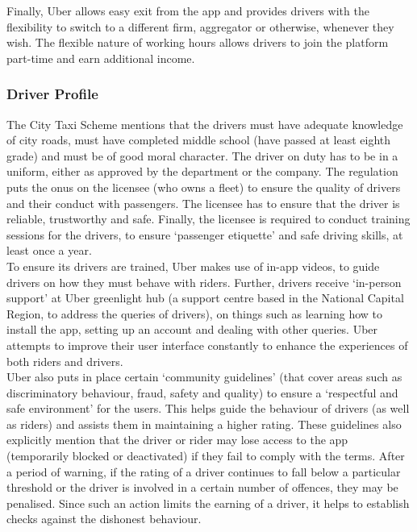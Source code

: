 \documentclass[a4paper, 12pt, twoside]{article}
\begin{document}
Finally, Uber allows easy exit from the app and provides drivers with the flexibility to switch to a different firm, aggregator or otherwise, whenever they wish. The flexible nature of working hours allows drivers to join the platform part-time and earn additional income.

\subsubsection{Driver Profile}
The City Taxi Scheme mentions that the drivers must have adequate knowledge of city roads, must have completed middle school (have passed at least eighth grade) and must be of good moral character. The driver on duty has to be in a uniform, either as approved by the department or the company. The regulation puts the onus on the licensee (who owns a fleet) to ensure the quality of drivers and their conduct with passengers. The licensee has to ensure that the driver is reliable, trustworthy and safe. Finally, the licensee is required to conduct training sessions for the drivers, to ensure ‘passenger etiquette’ and safe driving skills, at least once a year. \\

To ensure its drivers are trained, Uber makes use of in-app videos, to guide drivers on how they must behave with riders. Further, drivers receive ‘in-person support’ at Uber greenlight hub (a support centre based in the National Capital Region, to address the queries of drivers), on things such as learning how to install the app, setting up an account and dealing with other queries. Uber attempts to improve their user interface constantly to enhance the experiences of both riders and drivers. \\

Uber also puts in place certain ‘community guidelines’ (that cover areas such as discriminatory behaviour, fraud, safety and quality) to ensure a ‘respectful and safe environment’ for the users. This helps guide the behaviour of drivers (as well as riders) and assists them in maintaining a higher rating. These guidelines also explicitly mention that the driver or rider may lose access to the app (temporarily blocked or deactivated) if they fail to comply with the terms. After a period of warning, if the rating of a driver continues to fall below a particular threshold or the driver is involved in a certain number of offences, they may be penalised. Since such an action limits the earning of a driver, it helps to establish checks against the dishonest behaviour. 
\end{document}
